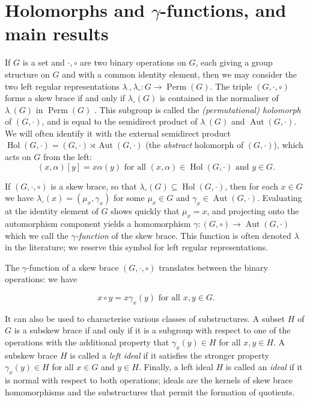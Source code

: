 \documentclass[12pt,a4paper, reqno]{amsart}
\theoremstyle{definition}
\DeclareMathOperator{\Perm}{\mbox{Perm}}
\DeclareMathOperator{\Hol}{\mbox{Hol}}
\DeclareMathOperator{\Aut}{\mbox{Aut}}
\begin{document}
\section{Holomorphs and $ \gamma $-functions, and main results} \label{sec_main}

If $ G $ is a set and $ \cdot,\circ $ are two binary operations on $ G $, each giving a group structure on $ G $ and with a common identity element, then we may consider the two left regular representations $ \lambda_{\cdot}, \lambda_{\circ} : G \rightarrow \Perm(G) $. The triple $ (G,\cdot,\circ) $ forms a skew brace if and only if $ \lambda_{\circ}(G) $ is contained in the normaliser of $ \lambda_{\cdot}(G) $ in $ \Perm(G) $ \cite{GV17}. This subgroup is called the \textit{(permutational) holomorph} of $ (G,\cdot) $, and is equal to the semidirect product of $ \lambda_{\cdot}(G) $ and $ \Aut(G,\cdot) $. We will often identify it with the external semidirect product $ \Hol(G,\cdot) = (G,\cdot) \rtimes \Aut(G,\cdot) $ (the \textit{abstract} holomorph of $ (G,\cdot) $), which acts on $ G $ from the left:
\begin{equation} \label{eqn_hol_action}
(x,\alpha)[y] = x\alpha(y) \mbox{ for all } (x,\alpha) \in \Hol(G,\cdot) \mbox{ and } y \in G. 
\end{equation}

If $ (G,\cdot,\circ) $ is a skew brace, so that $ \lambda_{\circ}(G) \subseteq \Hol(G,\cdot) $, then for each $ x \in G $ we have $ \lambda_{\circ}(x) = (\mu_{x}, \gamma_{x}) $ for some $ \mu_{x} \in G $ and $ \gamma_{x} \in \Aut(G,\cdot) $. Evaluating at the identity element of $ G $ shows quickly that $ \mu_{x} = x $, and projecting onto the automorphism component yields a homomorphism $ \gamma : (G,\circ) \rightarrow \Aut(G,\cdot) $ which we call the \textit{$ \gamma $-function} of the skew brace. This function is often denoted $ \lambda $ in the literature; we reserve this symbol for left regular representations. 

The $ \gamma $-function of a skew brace $ (G,\cdot,\circ) $ translates between the binary operations: we have

\begin{equation} \label{eqn_gamma_translates}
x \circ y = x \gamma_{x}(y) \mbox{ for all } x,y \in G. 
\end{equation}

It can also be used to characterise various classes of substructures. A subset $ H $ of $ G $ is a subskew brace if and only if it is a subgroup with respect to one of the operations with the additional property that $ \gamma_{x}(y) \in H $ for all $ x,y \in H $. A subskew brace $ H $ is called a \textit{left ideal} if it satisfies the stronger property $ \gamma_{x}(y) \in H $ for all $ x \in G $ and $ y \in H $. Finally, a left ideal $ H $ is called an  \textit{ideal} if it is normal with respect to both operations; ideals are the kernels of skew brace homomorphisms and the substructures that permit the formation of quotients.
\end{document}
